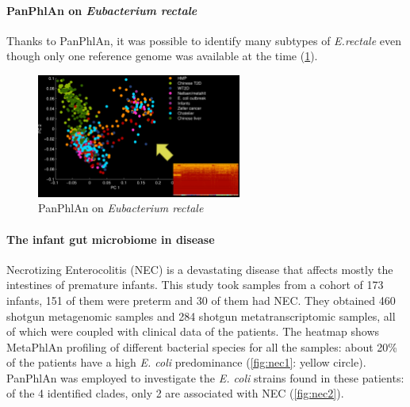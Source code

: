             \paragraph{PanPhlAn on \emph{Eubacterium rectale}}
            Thanks to PanPhlAn, it was possible to identify many subtypes of \emph{E.rectale} even though only one reference genome was available at the time (\ref{fig:Erec}).

            \begin{figure}[!h]
            \centering
            \includegraphics[width=0.6\textwidth]{Erectale.png}
            \caption{\label{fig:Erec} PanPhlAn on \emph{Eubacterium rectale}}
            \end{figure}

            \paragraph{The infant gut microbiome in disease}
            Necrotizing Enterocolitis (NEC) is a devastating disease that affects mostly the intestines of premature infants.
            This study took samples from a cohort of 173 infants, 151 of them were preterm and 30 of them had NEC.
            They obtained 460 shotgun metagenomic samples and 284 shotgun metatranscriptomic samples, all of which were coupled with clinical data of the patients.
            The heatmap shows MetaPhlAn profiling of different bacterial species for all the samples: about 20\% of the patients have a high \emph{E. coli} predominance (\ref{fig:nec1}: yellow circle).
            PanPhlAn was employed to investigate the \emph{E. coli} strains found in these patients: of the 4 identified clades, only 2 are associated with NEC (\ref{fig:nec2}).

